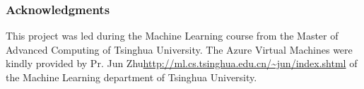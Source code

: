 \documentclass{article} %
\begin{document}
\subsubsection*{Acknowledgments}

	This project was led during the Machine Learning course from the Master of Advanced Computing of Tsinghua University. The Azure Virtual Machines were kindly provided by Pr. Jun Zhu\url{http://ml.cs.tsinghua.edu.cn/~jun/index.shtml} of the Machine Learning department of Tsinghua University.

\nocite{*}


\end{document}
